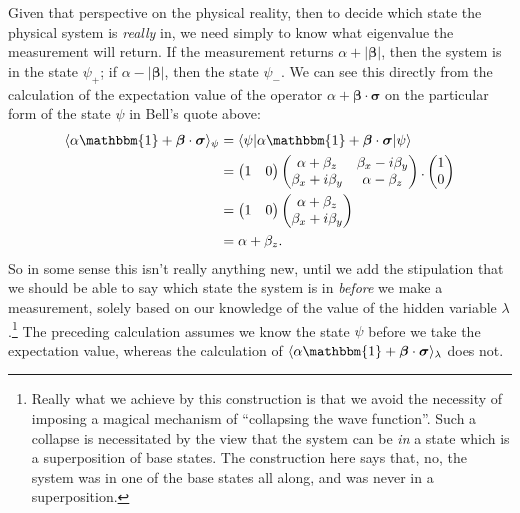 \documentclass[12pt]{article}
\begin{document}
Given that perspective on the physical reality, then to decide which state the physical system is \emph{really} in, we need simply to know what eigenvalue the measurement will return.  If the measurement returns $\alpha + |\bm{\beta}|$, then the system is in the state $\psi_{+}$; if $\alpha - |\bm{\beta}|$, then the state $\psi_{-}$.  We can see this directly from the calculation of the expectation value of the operator $\alpha + \bm{\beta} \cdot \bm{\sigma}$ on the particular form of the state $\psi$ in Bell's quote above:
\begin{displaymath}
  \begin{split}
    \langle \alpha \mathbbm{1} + \bm{\beta} \cdot \bm{\sigma} \rangle_{\psi}
    &= \langle \psi | \alpha \mathbbm{1} + \bm{\beta} \cdot \bm{\sigma} | \psi \rangle \\
    &=
    \begin{pmatrix}
      1 & 0
    \end{pmatrix}
    \begin{pmatrix}
      \alpha + \beta_z & \beta_x - i \beta_y \\
      \beta_x + i \beta_y & \alpha - \beta_z
    \end{pmatrix}.
    \begin{pmatrix}
      1 \\
      0
    \end{pmatrix}
    \\
    &=
    \begin{pmatrix}
      1 & 0
    \end{pmatrix}
    \begin{pmatrix}
      \alpha + \beta_z \\
      \beta_x + i\beta_y
    \end{pmatrix}
    \\
    &= \alpha + \beta_z.
  \end{split}
\end{displaymath}
So in some sense this isn't really anything new, until we add the stipulation that we should be able to say which state the system is in \emph{before} we make a measurement, solely based on our knowledge of the value of the hidden variable $\lambda$.\footnote{Really what we achieve by this construction is that we avoid the necessity of imposing a magical mechanism of ``collapsing the wave function''.  Such a collapse is necessitated by the view that the system can be \emph{in} a state which is a superposition of base states.  The construction here says that, no, the system was in one of the base states all along, and was never in a superposition.}  The preceding calculation assumes we know the state $\psi$ before we take the expectation value, whereas the calculation of $\langle \alpha \mathbbm{1} + \bm{\beta} \cdot \bm{\sigma} \rangle_{\lambda}$ does not.
\end{document}
